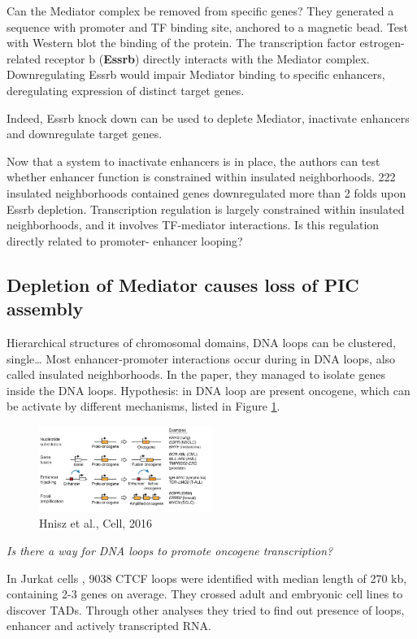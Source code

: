 Can the Mediator complex be removed from specific genes? They generated a sequence with promoter and TF binding site, anchored to a magnetic bead. Test with Western blot the binding of the protein. The transcription factor estrogen-related receptor b (\textbf{Essrb}) directly interacts with the Mediator complex. Downregulating Essrb would impair Mediator binding to specific enhancers, deregulating expression of distinct target genes.

Indeed, Essrb knock down can be used to deplete Mediator, inactivate enhancers and downregulate target genes.

Now that a system to inactivate enhancers is in place, the authors can test whether enhancer function is constrained within insulated neighborhoods. 222 insulated neighborhoods contained genes downregulated more than 2 folds upon Essrb depletion. Transcription regulation is largely constrained within insulated neighborhoods, and it involves TF-mediator interactions. Is this regulation directly related to promoter- enhancer looping?

\subsection{Depletion of Mediator causes loss of PIC assembly}

Hierarchical structures of chromosomal domains, DNA loops can be clustered, single\ldots{}
Most enhancer-promoter interactions occur during in DNA loops, also called insulated neighborhoods. In the paper, they managed to isolate genes inside the DNA loops.
Hypothesis: in DNA loop are present oncogene, which can be activate by different mechanisms, listed in Figure \ref{fig:proto}.

\begin{figure}
\centering
\includegraphics[width=0.5\textwidth]{../_resources/4eb79fba5a169cc3d31f5400dee44c80.png}
\caption{Hnisz et al., Cell, 2016}
\label{fig:proto}
\end{figure}

\emph{Is there a way for DNA loops to promote oncogene transcription?}

In Jurkat cells , 9038 CTCF loops were identified with median length of 270 kb, containing 2-3 genes on average. They crossed adult and embryonic cell lines to discover TADs. Through other analyses they tried to find out presence of loops, enhancer and actively transcripted RNA.

